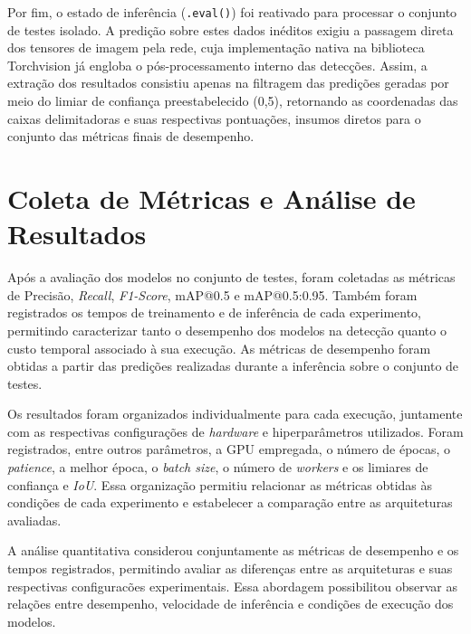 Por fim, o estado de inferência (\texttt{.eval()}) foi reativado para processar o conjunto de testes
isolado. A predição sobre estes dados inéditos exigiu a passagem direta dos tensores de
imagem pela rede, cuja implementação nativa na biblioteca Torchvision já engloba o
pós-processamento interno das detecções. Assim, a extração dos resultados consistiu apenas
na filtragem das predições geradas por meio do limiar de confiança preestabelecido (0,5),
retornando as coordenadas das caixas delimitadoras e suas respectivas pontuações, insumos
diretos para o conjunto das métricas finais de desempenho.

\section[Coleta de Métricas e Análise de Resultados]{Coleta de Métricas e Análise de\\Resultados}
Após a avaliação dos modelos no conjunto de testes, foram coletadas as métricas de Precisão,
\textit{Recall}, \textit{F1-Score}, mAP@0.5 e mAP@0.5:0.95. Também foram registrados os
tempos de treinamento e de inferência de cada experimento, permitindo caracterizar tanto o
desempenho dos modelos na detecção quanto o custo temporal associado à sua execução. As
métricas de desempenho foram obtidas a partir das predições realizadas durante a inferência
sobre o conjunto de testes.

Os resultados foram organizados individualmente para cada execução, juntamente com as
respectivas configurações de \textit{hardware} e hiperparâmetros utilizados. Foram
registrados, entre outros parâmetros, a GPU empregada, o número de épocas, o
\textit{patience}, a melhor época, o \textit{batch size}, o número de \textit{workers} e os
limiares de confiança e \textit{IoU}. Essa organização permitiu relacionar as métricas
obtidas às condições de cada experimento e estabelecer a comparação entre as arquiteturas
avaliadas.

A análise quantitativa considerou conjuntamente as métricas de desempenho e os tempos
registrados, permitindo avaliar as diferenças entre as arquiteturas e suas respectivas
configuracões experimentais. Essa abordagem possibilitou observar as relações entre
desempenho, velocidade de inferência e condições de execução dos modelos.

